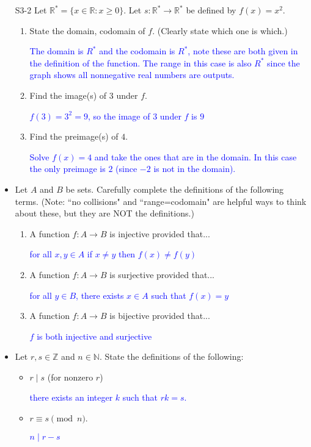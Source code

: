 \documentclass[10pt]{article}
\newcommand{\R}{\mathbb{R}}
\newcommand{\Z}{\mathbb{Z}}
\newcommand{\N}{\mathbb{N}}
\newcommand{\blue}{\textcolor{blue}}
\newcommand{\bs}{\begin{solution}}
\begin{document}
\begin{itemize}
\item[S3-2]  Let $\R^* = \{x\in \R: x\ge 0\}$.  Let $s: \R^* \to \R^*$ be defined by $f(x) = x^2$.
		\begin{enumerate}
		\item State the domain, codomain of $f$. (Clearly state which one is which.)
		\bs\blue{The domain is $R^*$ and the codomain is $R^*$, note these are both given in the definition of the function. The range in this case is also $R^*$ since the graph shows all nonnegative real numbers are outputs.}\end{solution}
		\vspace{1in}
		\item Find the image(s) of $3$ under $f$.
		\bs\blue{$f(3) = 3^2=9$, so the image of $3$ under $f$ is $9$}\end{solution}
		\vspace{1in}
		\item Find the preimage(s) of $4$.
		\bs\blue{Solve $f(x) = 4$ and take the ones that are in the domain. In this case the only preimage is $2$ (since $-2$ is not in the domain).}\end{solution}
		\vspace{1in}
		\end{enumerate} 
\newpage


\item[S4-1] Let $A$ and $B$ be sets. Carefully complete the definitions of the following terms. (Note: ``no collisions" and ``range=codomain" are helpful ways to think about these, but they are NOT the definitions.)
		\begin{enumerate}
		\item  A function $f: A \to B$ is injective provided that...
		\bs\blue{for all $x,y\in A$ if $x\neq y$ then $f(x) \neq f(y)$}\end{solution}
		\vspace{1in}
		\item A function $f: A\to B$ is surjective provided that...
		\bs \blue{for all $y\in B$, there exists $x\in A$ such that $f(x)=y$}\end{solution}
		\vspace{1in}
		\item A function $f: A\to B$ is bijective provided that...
		\bs\blue{$f$ is both injective and surjective}\end{solution}
		\vspace{1in}
		\end{enumerate}


\item[S6-1] Let $r,s\in\Z$ and $n\in\N$. State the definitions of the following:
\begin{itemize}
\item $r\mid s$ (for nonzero $r$) \bs\blue{there exists an integer $k$ such that $rk=s$.}\end{solution}
\vspace{.5in}
\item  $r \equiv s\pmod{n}$.  
\bs\blue{$n\mid r - s$}\end{solution}
\vspace{.5in}
\end{itemize}


\end{itemize}
\end{document}
